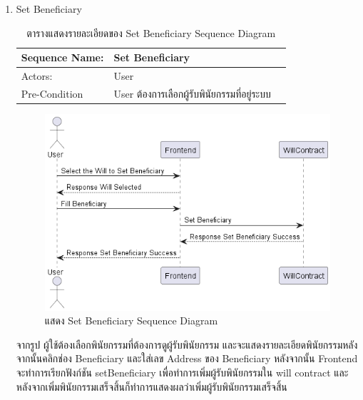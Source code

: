 \documentclass[12pt,oneside,openright,a4paper]{cpe-thai-project}
\begin{document}
\begin{enumerate}[label=\thesubsection.\arabic*,leftmargin=0pt,itemindent=1.25cm]
\clearpage
\item Set Beneficiary
	\begin{table}[h]
	\centering
	\caption{ตารางแสดงรายละเอียดของ Set Beneficiary Sequence Diagram}
	\begin{tabularx}{\textwidth}{|l|X|X|} 
		\hline
		Sequence Name: & Set Beneficiary                                  \\ 
		\hline
		Actors:        & User                                                  \\ 
		\hline
		Pre-Condition  & User ต้องการเลือกผู้รับพินัยกรรมที่อยู่ระบบ \\
		\hline
		\end{tabularx}
	\end{table}
		\begin{figure}[!thb]
			\centering
			\includegraphics[scale=0.6]{setBeneficiaryseq}
			\caption{แสดง Set Beneficiary Sequence Diagram}
		\end{figure}
		\FloatBarrier
	\tab จากรูป ผู้ใช้ต้องเลือกพินัยกรรมที่ต้องการดูผู้รับพินัยกรรม และจะแสดงรายละเอียดพินัยกรรมหลังจากนั้นคลิกช่อง Beneficiary และใส่เลข Address ของ Beneficiary หลังจากนั้น Frontend จะทำการเรียกฟังก์ชัน setBeneficiary เพื่อทำการเพิ่มผู้รับพินัยกรรมใน will contract และหลังจากเพิ่มพินัยกรรมเสร็จสิ้นก็ทำการแสดงผลว่าเพิ่มผู้รับพินัยกรรมเสร็จสิ้น
	

\end{enumerate}
\end{document}
